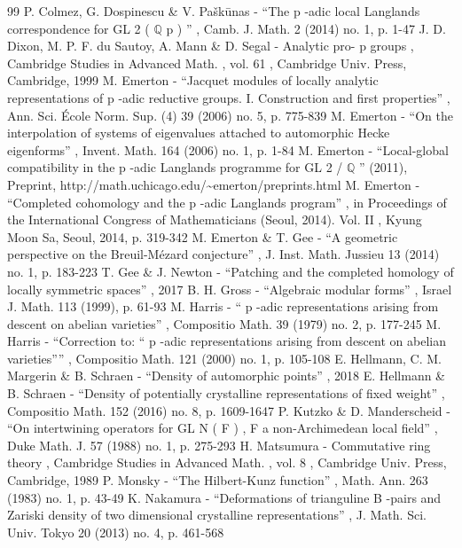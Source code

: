 \documentclass[11pt]{article}
\begin{document}
\begin{thebibliography}{99}
 P. Colmez, G. Dospinescu \& V. Paškūnas - “The p -adic local Langlands correspondence for GL 2 ( \(\mathbb Q\) p ) ” , Camb. J. Math. 2 (2014) no. 1, p. 1-47
 J. D. Dixon, M. P. F. du Sautoy, A. Mann \& D. Segal - Analytic pro- p groups , Cambridge Studies in Advanced Math. , vol. 61 , Cambridge Univ. Press, Cambridge, 1999
 M. Emerton - “Jacquet modules of locally analytic representations of p -adic reductive groups. I. Construction and first properties” , Ann. Sci. École Norm. Sup. (4) 39 (2006) no. 5, p. 775-839
 M. Emerton - “On the interpolation of systems of eigenvalues attached to automorphic Hecke eigenforms” , Invent. Math. 164 (2006) no. 1, p. 1-84
 M. Emerton - “Local-global compatibility in the p -adic Langlands programme for GL 2 / \(\mathbb Q\) ” (2011), Preprint, http://math.uchicago.edu/\textasciitilde{}emerton/preprints.html
 M. Emerton - “Completed cohomology and the p -adic Langlands program” , in Proceedings of the International Congress of Mathematicians (Seoul, 2014). Vol. II , Kyung Moon Sa, Seoul, 2014, p. 319-342
 M. Emerton \& T. Gee - “A geometric perspective on the Breuil-Mézard conjecture” , J. Inst. Math. Jussieu 13 (2014) no. 1, p. 183-223
 T. Gee \& J. Newton - “Patching and the completed homology of locally symmetric spaces” , 2017
 B. H. Gross - “Algebraic modular forms” , Israel J. Math. 113 (1999), p. 61-93
 M. Harris - “ p -adic representations arising from descent on abelian varieties” , Compositio Math. 39 (1979) no. 2, p. 177-245
 M. Harris - “Correction to: “ p -adic representations arising from descent on abelian varieties”” , Compositio Math. 121 (2000) no. 1, p. 105-108
 E. Hellmann, C. M. Margerin \& B. Schraen - “Density of automorphic points” , 2018
 E. Hellmann \& B. Schraen - “Density of potentially crystalline representations of fixed weight” , Compositio Math. 152 (2016) no. 8, p. 1609-1647
 P. Kutzko \& D. Manderscheid - “On intertwining operators for GL N ( F ) , F a non-Archimedean local field” , Duke Math. J. 57 (1988) no. 1, p. 275-293
 H. Matsumura - Commutative ring theory , Cambridge Studies in Advanced Math. , vol. 8 , Cambridge Univ. Press, Cambridge, 1989
 P. Monsky - “The Hilbert-Kunz function” , Math. Ann. 263 (1983) no. 1, p. 43-49
 K. Nakamura - “Deformations of trianguline B -pairs and Zariski density of two dimensional crystalline representations” , J. Math. Sci. Univ. Tokyo 20 (2013) no. 4, p. 461-568

\end{thebibliography}
\end{document}
